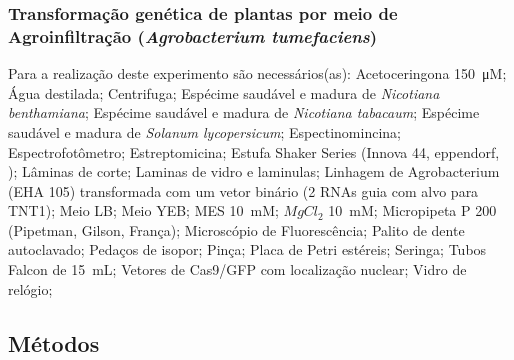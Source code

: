 \subsubsection {Transformação genética de plantas por meio de Agroinfiltração (\textit{Agrobacterium tumefaciens})}

	Para a realização deste experimento são necessários(as): Acetoceringona \qty{150}{\micro M}; Água destilada; Centrifuga; Espécime saudável e madura de \textit{Nicotiana benthamiana}; Espécime saudável e madura de \textit{Nicotiana tabacaum}; Espécime saudável e madura de \textit{Solanum lycopersicum}; Espectinomincina;
	 Espectrofotômetro; Estreptomicina; Estufa Shaker Series (Innova 44, eppendorf, ); Lâminas de corte; Laminas de vidro e laminulas; Linhagem de Agrobacterium (EHA 105) transformada com um vetor binário (2 RNAs guia com alvo para TNT1); Meio LB; Meio YEB; MES \qty{10}{mM}; $MgCl_2$ \qty{10}{mM}; Micropipeta P 200 (Pipetman, Gilson, França); Microscópio de Fluorescência; Palito de dente autoclavado; Pedaços de isopor; Pinça; Placa de Petri estéreis; Seringa; Tubos Falcon de \qty{15}{mL}; Vetores de Cas9/GFP com localização nuclear; Vidro de relógio; 


\subsection{Métodos}
